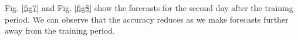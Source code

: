 \documentclass[journal]{IEEEtran}
\begin{document}
Fig. \ref{fig7} and Fig. \ref{fig8} show the forecasts for the second day after the training period. We can observe that the accuracy reduces as we make forecasts further away from the training period.

%
%



%
%
\end{document}

